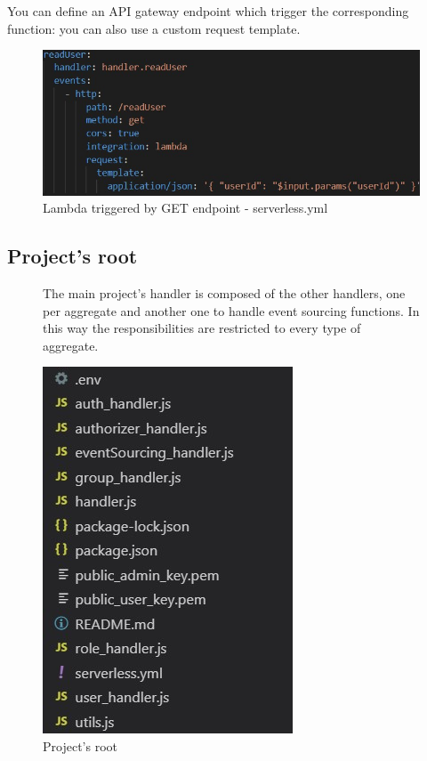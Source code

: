  You can define an API gateway endpoint which trigger the corresponding function: you can also use a custom request template.
\begin{figure} [H]
	\centering
	\includegraphics[scale=1.2]{../Img/serv5}
	\caption{Lambda triggered by GET endpoint - serverless.yml}\label{}
\end{figure}



\subsection{Project's root}
\begin{figure} [H]
The main project's handler is composed of the other handlers, one per aggregate and another one to handle event sourcing functions. In this way the responsibilities are restricted to every type of aggregate.

	\centering
	\includegraphics[scale=1.4]{../Img/root}
	\caption{Project's root}\label{}
\end{figure}

